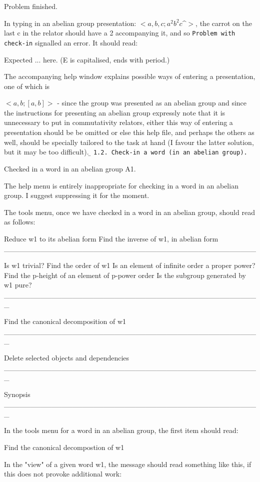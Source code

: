 \ni Problem finished.

\m\ni
In typing in an abelian group presentation:
$<a,b,c; a^2 b^2 c$\^{}$>$,
the carrot on the last c in the relator should have a 2 
accompanying it, and so {\tt Problem with check-in} 
signalled an error. It should read:

\m\ni Expected ...  here. (E is capitalised, ends with period.)

\m\ni The accompanying help window  explains possible 
ways of entering a presentation, one of which is 

\m\ni $<a,b;[a,b]>$ - since the group was presented as an abelian group
and since the instructions for presenting an abelian group expressly
note  that it is unnecessary to put in commutativity relators,
either this way of entering a presentation should be  be 
omitted or else this help file, and perhaps the others as well, should
be specially tailored to the task at hand (I favour the latter
solution, but it may be too difficult).
\b\m\ni
{\tt 1.2. Check-in a word (in an abelian group).}

\m\ni Checked in a word in an abelian group A1. 

\m\ni The help menu is entirely inappropriate for checking
in a word in an abelian group. I suggest suppressing it for
the moment.

\m\ni The tools menu, once we have checked in a word in
an abelian group, should read as follows:

Reduce w1 to its abelian form
Find the inverse of w1, in abelian form
________________________________________________

Is w1 trivial?
Find the order of w1
Is an element of infinite order a proper power?
Find the p-height of an element of p-power order
Is the subgroup generated by w1 pure?
_________________________________________________

Find the canonical decomposition of w1
_________________________________________________

Delete selected objects and dependencies
_________________________________________________

Synopsis
_________________________________________________

In the tools menu for a word in an abelian group, the first
item should read:

\m\ni Find the canonical decompostion of w1

\m\ni In the "view" of a given word w1, the message should read
something like this, if this does not provoke additional work:

